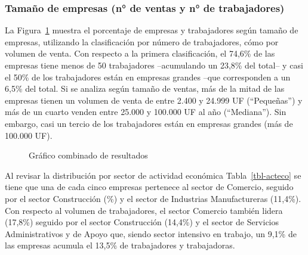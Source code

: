 \documentclass[
  11pt,
]{article}
\begin{document}
\subsubsection{Tamaño de empresas (n° de ventas y n° de
trabajadores)}\label{tamauxf1o-de-empresas-n-de-ventas-y-n-de-trabajadores}

La Figura~\ref{fig-combined} muestra el porcentaje de empresas y
trabajadores según tamaño de empresas, utilizando la clasificación por
número de trabajadores, cómo por volumen de venta. Con respecto a la
primera clasificación, el 74,6\% de las empresas tiene menos de 50
trabajadores --acumulando un 23,8\% del total-- y casi el 50\% de los
trabajadores están en empresas grandes --que corresponden a un 6,5\% del
total. Si se analiza según tamaño de ventas, más de la mitad de las
empresas tienen un volumen de venta de entre 2.400 y 24.999 UF
(``Pequeñas'') y más de un cuarto venden entre 25.000 y 100.000 UF al
año (``Mediana''). Sin embargo, casi un tercio de los trabajadores están
en empresas grandes (más de 100.000 UF).

\FloatBarrier

\begin{figure}[H]

\caption{\label{fig-combined}Gráfico combinado de resultados}


\end{figure}%

\FloatBarrier

Al revisar la distribución por sector de actividad económica
Tabla~\ref{tbl-acteco} se tiene que una de cada cinco empresas pertenece
al sector de Comercio, seguido por el sector Construcción (\%)
y el sector de Industrias Manufactureras (11,4\%). Con respecto al
volumen de trabajadores, el sector Comercio también lidera (17,8\%)
seguido por el sector Construcción (14,4\%) y el sector de Servicios
Administrativos y de Apoyo que, siendo sector intensivo en trabajo, un
9,1\% de las empresas acumula el 13,5\% de trabajadores y trabajadoras.
\end{document}
